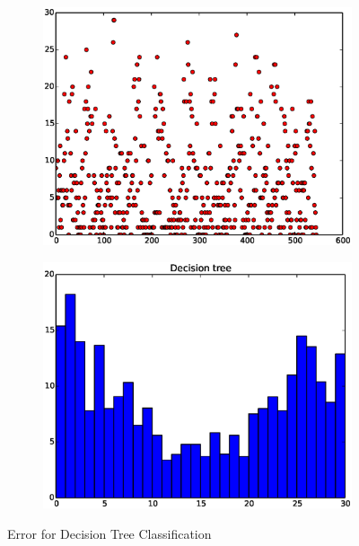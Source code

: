 \documentclass{article}
\begin{document}
\begin{figure}[H]
  \begin{subfigure}[!h]{0.5\textwidth}
    \centering
    \includegraphics[width=\textwidth]{./woodley/Decision_tree_heading_plot.eps}
  \end{subfigure}
  \begin{subfigure}[!h]{0.5\textwidth}
    \centering
    \includegraphics[width=\textwidth]{./woodley/Decision_tree_heading_bar.eps}
  \end{subfigure}
  \caption{Error for Decision Tree Classification}
\end{figure}
\end{document}
